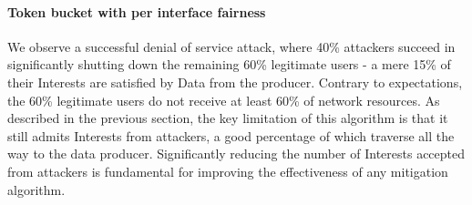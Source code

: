 %
%
%

\paragraph{\textbf{Token bucket with per interface fairness}}

We observe a successful denial of service attack, where 40\% attackers succeed in significantly shutting down the remaining 60\% legitimate users - a mere 15\% of their Interests are satisfied by Data from the producer. Contrary to expectations, the 60\% legitimate users do not receive at least 60\% of network resources. As described in the previous section, the key limitation of this algorithm is that it still admits Interests from attackers, a good percentage of which traverse all the way to the data producer. Significantly reducing the number of Interests accepted from attackers is fundamental for improving the effectiveness of any mitigation algorithm. 

